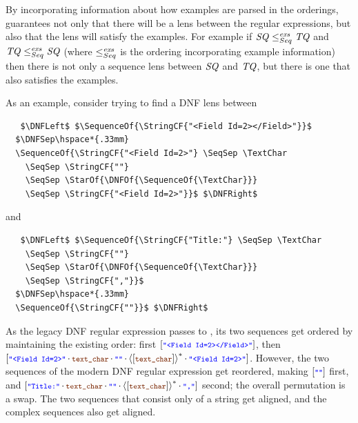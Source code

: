 \documentclass[acmsmall]{acmart}
\begin{document}
By incorporating information about how examples are parsed in the
orderings,
\SynthLens{} guarantees not only that there will be a lens between the regular
expressions, but also
that the lens will satisfy the examples.  For example if
$\mathit{SQ} \leq_{Seq}^{\mathit{exs}} \mathit{TQ}$ and
$\mathit{TQ} \leq_{Seq}^{\mathit{exs}} \mathit{SQ}$ (where
$\leq_{Seq}^{\mathit{exs}}$ is the ordering incorporating example information)
then there is not only a
sequence lens between $\mathit{SQ}$ and $\mathit{TQ}$, but there is one that also
satisfies the examples.

As an example, consider trying to find a DNF lens between
\begin{lstlisting}
   $\DNFLeft$ $\SequenceOf{\StringCF{"<Field Id=2></Field>"}}$
  $\DNFSep\hspace*{.33mm}
  \SequenceOf{\StringCF{"<Field Id=2>"} \SeqSep \TextChar
    \SeqSep \StringCF{""}
    \SeqSep \StarOf{\DNFOf{\SequenceOf{\TextChar}}}
    \SeqSep \StringCF{"<Field Id=2>"}}$ $\DNFRight$
\end{lstlisting}
and
\begin{lstlisting}
   $\DNFLeft$ $\SequenceOf{\StringCF{"Title:"} \SeqSep \TextChar
    \SeqSep \StringCF{""}
    \SeqSep \StarOf{\DNFOf{\SequenceOf{\TextChar}}}
    \SeqSep \StringCF{","}}$
  $\DNFSep\hspace*{.33mm}
  \SequenceOf{\StringCF{""}}$ $\DNFRight$
\end{lstlisting}
As the legacy DNF regular expression passes to \RigidSynth{}, its two
sequences get ordered
by maintaining the existing order:  first $\SequenceOf{\StringCF{"<Field
    Id=2></Field>"}}$, then
$\SequenceOf{\StringCF{"<Field Id=2>"} \SeqSep \TextChar
    \SeqSep \StringCF{""}
    \SeqSep \StarOf{\DNFOf{\SequenceOf{\TextChar}}}
    \SeqSep \StringCF{"<Field Id=2>"}}$.
However, the two sequences of the modern DNF regular expression get
reordered, making $\SequenceOf{\StringCF{""}}$ first,
and $\SequenceOf{\StringCF{"Title:"} \SeqSep \TextChar
    \SeqSep \StringCF{""}
    \SeqSep \StarOf{\DNFOf{\SequenceOf{\TextChar}}}
    \SeqSep \StringCF{","}}$ second;
the overall permutation is a swap.  The two sequences that consist
only of a string get aligned, and the complex sequences also get aligned.
\end{document}
